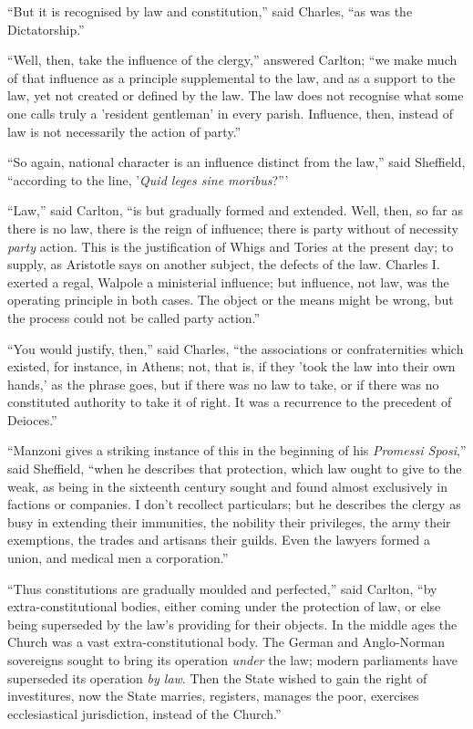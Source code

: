 ``But it is recognised by law and constitution,'' said
Charles, ``as was the Dictatorship.''

``Well, then, take the influence of the clergy,'' answered
Carlton; ``we make much of that influence as a principle
supplemental to the law, and as a support to the law, yet not created
or defined by the law. The law does not recognise what some one calls
truly a 'resident gentleman' in every parish. Influence, then, instead
of law is not necessarily the action of party.''

``So again, national character is an influence distinct from
the law,'' said Sheffield, ``according to the line, '\emph{Quid
leges sine moribus}?'''

``Law,'' said Carlton, ``is but gradually formed and
extended. Well, then, so far as there is no law, there is the
reign of influence; there is party without of necessity \emph{party}
action. This is the justification of Whigs and Tories at the present
day; to supply, as Aristotle says on another subject, the defects of
the law. Charles I. exerted a regal, Walpole a ministerial influence;
but influence, not law, was the operating principle in both cases. The
object or the means might be wrong, but the process could not be
called party action.''

``You would justify, then,'' said Charles, ``the
associations or confraternities which existed, for instance, in
Athens; not, that is, if they 'took the law into their own hands,' as
the phrase goes, but if there was no law to take, or if there was no
constituted authority to take it of right. It was a recurrence to the
precedent of Deioces.''

``Manzoni gives a striking instance of this in the beginning of
his \emph{Promessi Sposi},'' said Sheffield, ``when he
describes that protection, which law ought to give to the weak, as
being in the sixteenth century sought and found almost exclusively in
factions or companies. I don't recollect particulars; but he describes
the clergy as busy in extending their immunities, the nobility their
privileges, the army their exemptions, the trades and artisans their
guilds. Even the lawyers formed a union, and medical men a
corporation.''

``Thus constitutions are gradually moulded and perfected,''
said Carlton, ``by extra-constitutional bodies, either coming
under the protection of law, or else being superseded by the law's
providing for their objects. In the middle ages the Church was a
vast extra-constitutional body. The German and Anglo-Norman sovereigns
sought to bring its operation \emph{under} the law; modern parliaments
have superseded its operation \emph{by law}. Then the State wished to
gain the right of investitures, now the State marries, registers,
manages the poor, exercises ecclesiastical jurisdiction, instead of
the Church.''

